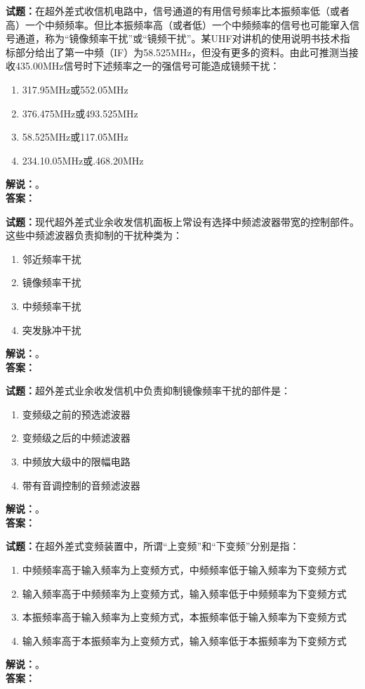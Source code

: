 \documentclass{ctexbook}
\begin{document}
\bigskip

\noindent\textbf{试题：}在超外差式收信机电路中，信号通道的有用信号频率比本振频率低（或者高）一个中频频率。但比本振频率高（或者低）一个中频频率的信号也可能窜入信号通道，称为“镜像频率干扰”或“镜频干扰”。某UHF对讲机的使用说明书技术指标部分给出了第一中频（IF）为58.525\unit{\MHz}，但没有更多的资料。由此可推测当接收435.00\unit{\MHz}信号时下述频率之一的强信号可能造成镜频干扰：
\begin{enumerate}[leftmargin=3em]
  \item 317.95\unit{\MHz}或552.05\unit{\MHz}
  \item 376.475\unit{\MHz}或493.525\unit{\MHz}
  \item 58.525\unit{\MHz}或117.05\unit{\MHz}
  \item 234.10.05\unit{\MHz}或.468.20\unit{\MHz}
\end{enumerate}
\noindent\textbf{解说：}\textbf{}。\\\noindent\textbf{答案：}

\bigskip

\noindent\textbf{试题：}现代超外差式业余收发信机面板上常设有选择中频滤波器带宽的控制部件。这些中频滤波器负责抑制的干扰种类为：
\begin{enumerate}[leftmargin=3em]
  \item 邻近频率干扰
  \item 镜像频率干扰
  \item 中频频率干扰
  \item 突发脉冲干扰
\end{enumerate}
\noindent\textbf{解说：}\textbf{}。\\\noindent\textbf{答案：}

\bigskip

\noindent\textbf{试题：}超外差式业余收发信机中负责抑制镜像频率干扰的部件是：
\begin{enumerate}[leftmargin=3em]
  \item 变频级之前的预选滤波器
  \item 变频级之后的中频滤波器
  \item 中频放大级中的限幅电路
  \item 带有音调控制的音频滤波器
\end{enumerate}
\noindent\textbf{解说：}\textbf{}。\\\noindent\textbf{答案：}

\bigskip

\noindent\textbf{试题：}在超外差式变频装置中，所谓“上变频”和“下变频”分别是指：
\begin{enumerate}[leftmargin=3em]
  \item 中频频率高于输入频率为上变频方式，中频频率低于输入频率为下变频方式
  \item 输入频率高于中频频率为上变频方式，输入频率低于中频频率为下变频方式
  \item 本振频率高于输入频率为上变频方式，本振频率低于输入频率为下变频方式
  \item 输入频率高于本振频率为上变频方式，输入频率低于本振频率为下变频方式
\end{enumerate}
\noindent\textbf{解说：}\textbf{}。\\\noindent\textbf{答案：}
\end{document}
